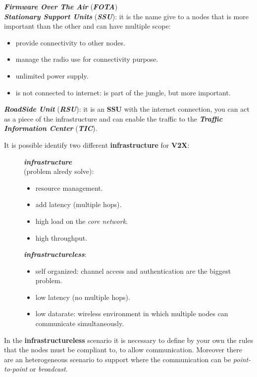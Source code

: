 \begin{boxA}
    \textbf{\textit{Firmware Over The Air}} (\textbf{\textit{FOTA}}) \\
    \textbf{\textit{Stationary Support Units}} (\textbf{\textit{SSU}}): it is the name give to a nodes that is more important than the other and can have multiple scope:
    \begin{itemize}[nosep]
        \item provide connectivity to other nodes.
        \item manage the radio use for connectivity purpose.
        \item unlimited power supply.
        \item is not connected to internet: is part of the jungle, but more important.
    \end{itemize}
    \textbf{\textit{RoadSide Unit}} (\textbf{\textit{RSU}}): it is an \textbf{SSU} with the internet connection, you can act as a piece of the infrastructure and can enable the traffic to the \textbf{\textit{Traffic Information Center}} (\textbf{\textit{TIC}}).
\end{boxA}
It is possible identify two different \textbf{infrastructure} for \textbf{V2X}:

\begin{figure}[h]
    \centering
    \begin{minipage}[t]{0.45\textwidth}
        \centering
        \textbf{\textit{infrastructure}} \\ (problem alredy solve):
        \begin{itemize}[nosep]
            \item resource management.
            \item add latency (multiple hops).
            \item high load on the \textit{core network}.
            \item high throughput.
        \end{itemize}
    \end{minipage}
    \begin{minipage}[t]{0.45\textwidth}
        \centering
        \textbf{\textit{infrastructureless}}:
        \begin{itemize}[nosep]
            \item self organized: channel access and authentication are the biggest problem.
            \item low latency (no multiple hops).
            \item low datarate: wireless environment in which multiple nodes can communicate simultaneously.
        \end{itemize}
    \end{minipage}
\end{figure}
In the \textbf{infrastructureless} scenario it is necessary to define by your own the rules that the nodes must be compliant to, to allow communication. Moreover there are an heterogeneous scenario to support where the communication can be \textit{point-to-point} or \textit{broadcast}.

